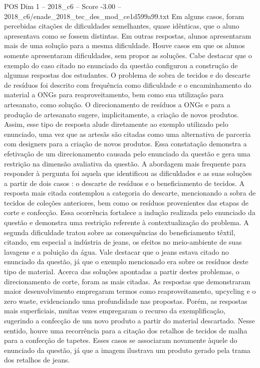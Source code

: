 \begin{textsample}{POS Dim 1 – 2018\_c6 – Score -3.00 – 2018\_c6/enade\_2018\_tec\_des\_mod\_ce1d599a99.txt}
Em alguns casos, foram percebidas citações de dificuldades semelhantes, quase idênticas, que o aluno apresentava como se fossem distintas.
Em outras respostas, alunos apresentaram mais de uma solução para a mesma dificuldade.
Houve casos em que os alunos somente apresentaram dificuldades, sem propor as soluções.
Cabe destacar que o exemplo do caso citado no enunciado da questão configurou a construção de algumas respostas dos estudantes.
O problema de sobra de tecidos e do descarte de resíduos foi descrito com frequência como dificuldade e o encaminhamento do material a ONGs para reaproveitamento, bem como sua utilização para artesanato, como solução.
O direcionamento de resíduos a ONGs e para a produção de artesanato sugere, implicitamente, a criação de novos produtos.
Assim, esse tipo de resposta alude diretamente ao exemplo utilizado pelo enunciado, uma vez que as artesãs são citadas como uma alternativa de parceria com designers para a criação de novos produtos.
Essa constatação demonstra a efetivação de um direcionamento causada pelo enunciado da questão e gera uma restrição na dimensão avaliativa da questão.
A abordagem mais frequente para responder à pergunta foi aquela que identificou as dificuldades e as suas soluções a partir de dois casos : o descarte de resíduos e o beneficiamento de tecidos.
A resposta mais citada contemplou a categoria do descarte, mencionando a sobra de tecidos de coleções anteriores, bem como os resíduos provenientes das etapas de corte e confecção.
Essa ocorrência fortalece a indução realizada pelo enunciado da questão e demonstra uma restrição referente à contextualização do problema.
A segunda dificuldade tratou sobre as consequências do beneficiamento têxtil, citando, em especial a indústria de jeans, os efeitos no meio-ambiente de suas lavagens e a poluição da água.
Vale destacar que o jeans estava citado no enunciado da questão, já que o exemplo mencionado era sobre os resíduos deste tipo de material.
Acerca das soluções apontadas a partir destes problemas, o direcionamento de corte, foram as mais citadas.
As respostas que demonstraram maior desenvolvimento empregaram termos como reaproveitamento, upcycling e o zero waste, evidenciando uma profundidade nas propostas.
Porém, as respostas mais superficiais, muitas vezes empregaram o recurso da exemplificação, sugerindo a confecção de um novo produto a partir do material descartado.
Nesse sentido, houve uma recorrência para a citação dos retalhos de tecidos de malha para a confecção de tapetes.
Esses casos se associaram novamente àquele do enunciado da questão, já que a imagem ilustrava um produto gerado pela trama dos retalhos de jeans.

\end{textsample}
